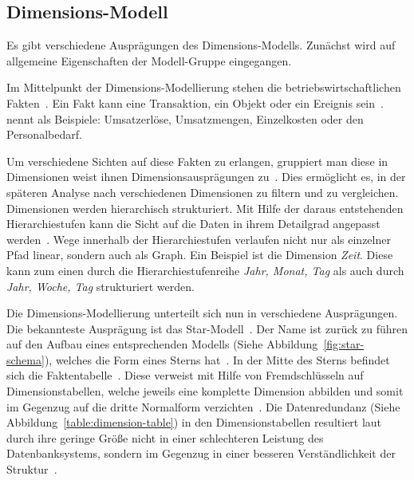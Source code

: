 \documentclass[
  language=german, %
  type=bachelor%
]{isthesis}
\begin{document}
\begin{content}

  \section{Dimensions-Modell}
  Es gibt verschiedene Ausprägungen des Dimensions-Modells. Zunächst wird auf
  allgemeine Eigenschaften der Modell-Gruppe eingegangen.

  Im Mittelpunkt der Dimensions-Modellierung stehen die
  betriebswirtschaftlichen Fakten~\cite[][S.  2]{phipps2002automating}. Ein
  Fakt kann eine Transaktion, ein Objekt oder ein Ereignis sein~\cite[][S.
  42]{ballard1998data}. \textsc{\citeauthor{Kemper2010}} nennt als Beispiele:
  \glqq{}Umsatzerlöse, Umsatzmengen, Einzelkosten oder den
  Personalbedarf\grqq{}\cite[][S. 66]{Kemper2010}. 
  
  Um verschiedene Sichten auf diese Fakten zu erlangen, gruppiert man diese in
  Dimensionen \bzw{} weist ihnen Dimensionsausprägungen zu~\cite[][S.
  66]{Kemper2010}. Dies ermöglicht es, in der späteren Analyse nach
  verschiedenen Dimensionen zu filtern und zu vergleichen. Dimensionen werden
  hierarchisch strukturiert. Mit Hilfe der daraus entstehenden Hierarchiestufen
  kann die Sicht auf die Daten in ihrem Detailgrad angepasst werden~\cite[][S.
  66]{Kemper2010}. Wege innerhalb der Hierarchiestufen verlaufen nicht nur als
  einzelner Pfad linear, sondern auch als Graph. Ein Beispiel ist die
  Dimension \textit{Zeit}.  Diese kann zum einen durch die
  Hierarchiestufenreihe \textit{Jahr, Monat, Tag} als auch durch \textit{Jahr,
  Woche, Tag} strukturiert werden.

  Die Dimensions-Modellierung unterteilt sich nun in verschiedene Ausprägungen.
  Die bekannteste Ausprägung ist das Star-Modell~\cite[][S.
  2]{phipps2002automating}. Der Name ist zurück zu f\"uhren auf den Aufbau
  eines entsprechenden Modells (Siehe Abbildung~\ref{fig:star-schema}), welches
  die Form eines Sterns hat~\cite[][S.  44]{Kimball2013}. In der Mitte des
  Sterns befindet sich die Faktentabelle~\cite[][S. 67]{Kemper2010}. Diese
  verweist mit Hilfe von Fremdschlüsseln auf Dimensionstabellen, welche jeweils
  eine komplette Dimension abbilden und somit im Gegenzug auf die dritte
  Normalform verzichten~\cite[][S. 67 f.]{Kemper2010}. Die
  Datenredundanz (Siehe Abbildung~\ref{table:dimension-table}) in den
  Dimensionstabellen resultiert laut \textsc{\citeauthor{Kimball2013}} durch
  ihre geringe Größe nicht in einer schlechteren Leistung des Datenbanksystems,
  sondern im Gegenzug in einer besseren Verständlichkeit der
  Struktur~\cite[][S. 15]{Kimball2013}.


\end{content}
\end{document}
